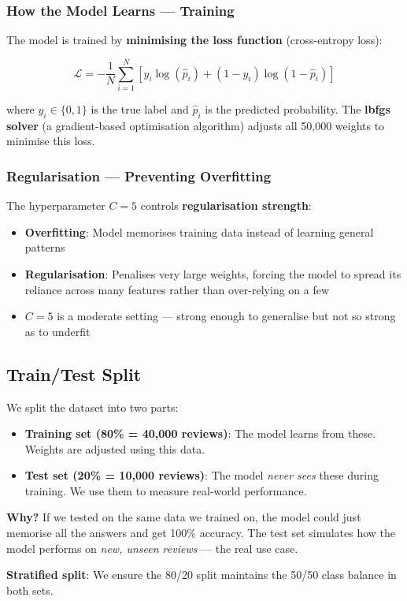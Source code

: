\documentclass[12pt, a4paper]{article}
\begin{document}
\subsubsection{How the Model Learns — Training}

The model is trained by \textbf{minimising the loss function} (cross-entropy loss):

\[
\mathcal{L} = -\frac{1}{N} \sum_{i=1}^{N} \left[ y_i \log(\hat{p}_i) + (1 - y_i) \log(1 - \hat{p}_i) \right]
\]

where $y_i \in \{0, 1\}$ is the true label and $\hat{p}_i$ is the predicted probability. The \textbf{lbfgs solver} (a gradient-based optimisation algorithm) adjusts all 50{,}000 weights to minimise this loss.

\subsubsection{Regularisation — Preventing Overfitting}

The hyperparameter $C = 5$ controls \textbf{regularisation strength}:

\begin{itemize}
  \item \textbf{Overfitting}: Model memorises training data instead of learning general patterns
  \item \textbf{Regularisation}: Penalises very large weights, forcing the model to spread its reliance across many features rather than over-relying on a few
  \item $C = 5$ is a moderate setting — strong enough to generalise but not so strong as to underfit
\end{itemize}

\subsection{Train/Test Split}

\begin{conceptbox}
We split the dataset into two parts:
\begin{itemize}
  \item \textbf{Training set (80\% = 40{,}000 reviews)}: The model learns from these. Weights are adjusted using this data.
  \item \textbf{Test set (20\% = 10{,}000 reviews)}: The model \emph{never sees} these during training. We use them to measure real-world performance.
\end{itemize}

\textbf{Why?} If we tested on the same data we trained on, the model could just memorise all the answers and get 100\% accuracy. The test set simulates how the model performs on \emph{new, unseen reviews} — the real use case.

\medskip
\textbf{Stratified split}: We ensure the 80/20 split maintains the 50/50 class balance in both sets.
\end{conceptbox}
\end{document}
